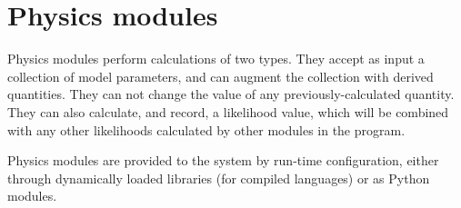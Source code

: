 \documentclass[draftmode,draftwater]{memarticle}
\begin{document}


\section{Physics modules}

Physics modules perform calculations of two types. They accept as input
a collection of model parameters, and can augment the collection with
derived quantities. They can not change the value of any
previously-calculated quantity. They can also calculate, and record, a
likelihood value, which will be combined with any other likelihoods
calculated by other modules in the program.

Physics modules are provided to the system by run-time configuration,
either through dynamically loaded libraries (for compiled languages) or
as Python modules.
\end{document}
